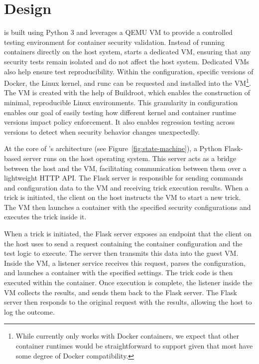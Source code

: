 \section{Design}
\label{sec:design}

\houdini is built using Python 3 and leverages a QEMU VM to provide a controlled testing environment for container security validation. Instead of running containers directly on the host system, \houdini starts a dedicated VM, ensuring that any security tests remain isolated and do not affect the host system. Dedicated VMs also help ensure test reproducibility. Within the \houdini configuration, specific versions of Docker, the Linux kernel, and runc can be requested and installed into the VM\footnote{While \houdini currently only works with Docker containers, we expect that other container runtimes would be straightforward to support given that most have some degree of Docker compatibility.}. The VM is created with the help of Buildroot\cite{buildroot}, which enables the construction of minimal, reproducible Linux environments. 
This granularity in configuration enables our goal of easily testing how different kernel and container runtime versions impact policy enforcement. It also enables regression testing across versions to detect when security behavior changes unexpectedly.

At the core of \houdini's architecture (see Figure~\ref{fig:state-machine}), a Python Flask-based server runs on the host operating system. This server acts as a bridge between the host and the VM, facilitating communication between them over a lightweight HTTP API. The Flask server is responsible for sending commands and configuration data to the VM and receiving trick execution results. When a trick is initiated, the \houdini client on the host instructs the VM to start a new trick. The VM then launches a container with the specified security configurations and executes the trick inside it.

When a trick is initiated, the Flask server exposes an endpoint that the \houdini client on the host uses to send a request containing the container configuration and the test logic to execute. The server then transmits this data into the guest VM. Inside the VM, a listener service receives this request, parses the configuration, and launches a container with the specified settings. The trick code is then executed within the container. Once execution is complete, the listener inside the VM collects the results, and sends them back to the Flask server. The Flask server then responds to the original request with the results, allowing the host to log the outcome.

